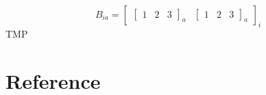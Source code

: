 \[
    B_{ia}=\left[\begin{array}{cc}
            \left[\begin{array}{lll}
                          1 &
                          2 &
                          3
                      \end{array}\right]_{a}
             &
            \left[\begin{array}{lll}
                          1 &
                          2 &
                          3
                      \end{array}\right]_{a}
        \end{array}\right]_{i}
\]
TMP




\section{Reference}




















